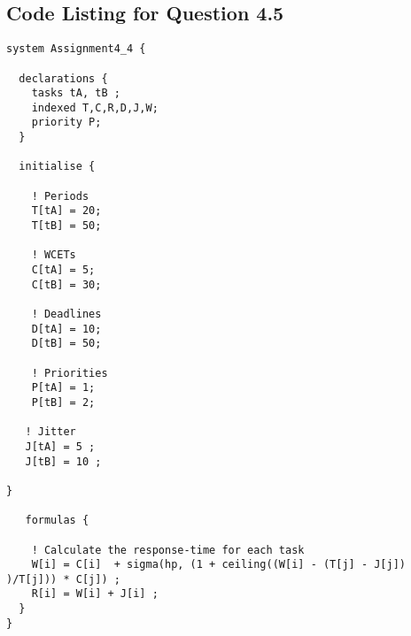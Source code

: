 \documentclass[oneside,a4paper]{article}
\begin{document}
\subsection*{\normalsize{Code Listing for Question 4.5}}\label{Q4_5}
\begin{lstlisting}
system Assignment4_4 {

  declarations {    
    tasks tA, tB ;
    indexed T,C,R,D,J,W;
    priority P;
  }

  initialise {

    ! Periods   
    T[tA] = 20;
    T[tB] = 50;
    
    ! WCETs
    C[tA] = 5;
    C[tB] = 30;

    ! Deadlines
    D[tA] = 10;
    D[tB] = 50;

    ! Priorities
    P[tA] = 1;
    P[tB] = 2;

   ! Jitter 
   J[tA] = 5 ;
   J[tB] = 10 ;

}

   formulas {  

    ! Calculate the response-time for each task
    W[i] = C[i]  + sigma(hp, (1 + ceiling((W[i] - (T[j] - J[j]) )/T[j])) * C[j]) ;
    R[i] = W[i] + J[i] ;
  }
}
\end{lstlisting}
\end{document}
